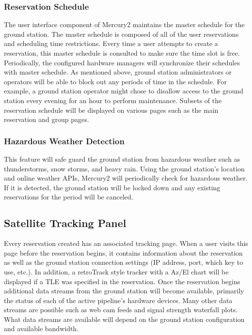 \documentclass{mxl-design}
\begin{document}
\subsubsection{Reservation Schedule}
The user interface component of Mercury2 maintains the master schedule for the ground station. The master schedule is composed of all of the user reservations and scheduling time restrictions. Every time a user attempts to create a reservation, this master schedule is consulted to make sure the time slot is free. Periodically, the configured hardware managers will synchronize their schedules with master schedule. As mentioned above, ground station administrators or operators will be able to block out any periods of time in the schedule. For example, a ground station operator might chose to disallow access to the ground station every evening for an hour to perform maintenance. Subsets of the reservation schedule will be displayed on various pages such as the main reservation  and group pages.
 
\subsubsection{Hazardous Weather Detection}
This feature will safe guard the ground station from hazardous weather such as thunderstorms, snow storms, and heavy rain. Using the ground station's location and online weather APIs, Mercury2 will periodically check for hazardous weather. If it is detected, the ground station will be locked down and any existing reservations for the period will be canceled. 

\subsection{Satellite Tracking Panel}
\label{sec:tracking_panel}
Every reservation created has an associated tracking page. When a user visits this page before the reservation begins, it contains information about the reservation as well as the ground station connection settings (IP address, port, which key to use, etc.). In addition, a retroTrack style tracker with a Az/El chart will be displayed if a TLE was specified in the reservation. Once the reservation begins additional data streams from the ground station will become available, primarily the status of each of the active pipeline's hardware devices. Many other data streams are possible such as web cam feeds and signal strength waterfall plots. What data streams are available will depend on the ground station configuration and available bandwidth.
\end{document}
